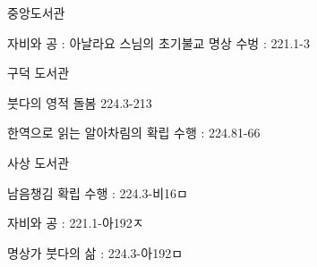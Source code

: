 \documentclass[	20pt, 
							a1paper, 
							portrait, %
							margin=0mm, %
							innermargin=10mm,  		%
							colspace=5mm, 
							subcolspace=0mm
							]{tikzposter}
\begin{document}
\begin{columns}
{\begin{LARGE}
중앙도서관

자비와 공 : 아날라요 스님의 초기불교 명상 수벙 : 221.1-3

구덕 도서관

붓다의 영적 돌봄 224.3-213

한역으로 읽는 알아차림의 확립 수행 : 224.81-66

사상 도서관

남음챙김 확립 수행 : 224.3-비16ㅁ

자비와 공 : 221.1-아192ㅈ

명상가 붓다의 삶 : 224.3-아192ㅁ

				\end{LARGE}
			} %




	\end{columns}
\end{document}
